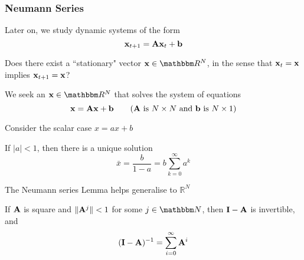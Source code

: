 \begin{frame}\frametitle{Neumann Series}

    \vspace{2em}
    Later on, we study dynamic systems of the form
        $${\mathbf x}_{t+1} = \mathbf A {\mathbf x}_t + {\mathbf b}$$
    
    \vspace{.7em}
    Does there exist a ``stationary" vector
  $\boldx \in \RR^N$, in the sense that ${\mathbf x}_t = {\mathbf x}$ implies ${\mathbf x}_{t+1} =
  {\mathbf x}$?
  
    We seek an $\boldx \in \RR^N$ that solves the
    system of equations
    \begin{equation}
        \label{eq:lpfde}
        {\mathbf x} = \mathbf A {\mathbf x} + {\mathbf b} 
        \qquad (\mathbf A \text{ is } N \times N \text{ and } {\mathbf b} \text{ is } N
        \times 1)
    \end{equation}
    
\end{frame}

\begin{frame}
    
    \vspace{2em}
    Consider the scalar case $x = a x + b$
    
    \vspace{.7em}
    If $|a| < 1$, then there is a unique solution
    \begin{equation*}
        \bar x 
        = \frac{b}{1-a} 
        = b \sum_{k=0}^{\infty} a^k 
    \end{equation*}
 
    \vspace{.7em}
    The Neumann series Lemma helps generalise to $\mathbb{R}^{N}$
    
    \vspace{1em}
    \Thm{\eqref{ET-t:nms}}
    If $\mathbf A$ is square and $\| \mathbf A^j \| < 1$
    for some $j \in \NN$, then $\mathbf I - \mathbf A$ is invertible, and
    \begin{equation*}
        \label{eq:nmse}
        (\mathbf I - \mathbf A)^{-1} = \sum_{i=0}^{\infty} \mathbf A^i 
    \end{equation*}
    
\end{frame}
 
